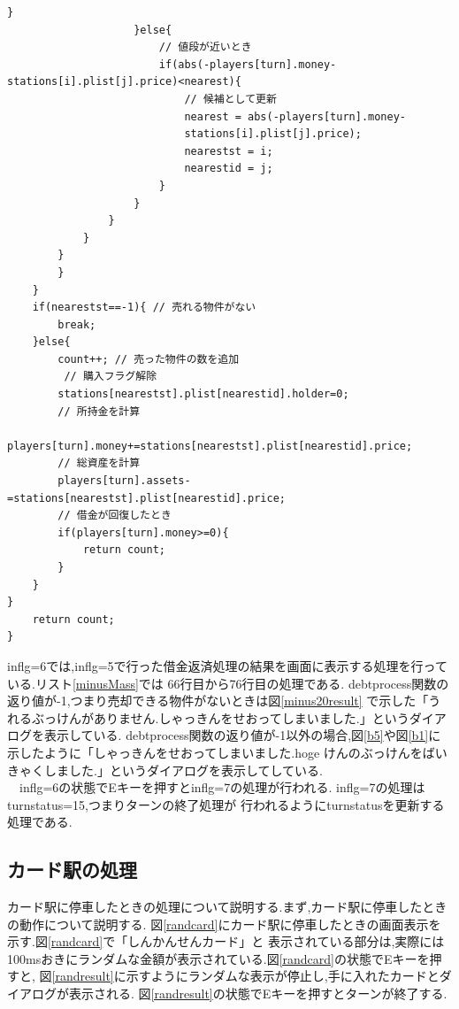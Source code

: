 \documentclass[a4j]{jarticle}
\begin{document}
\begin{lstlisting}[basicstyle=\ttfamily\footnotesize, frame=single,label=sale,caption=sale関数]
                    }
                    }else{
                        // 値段が近いとき
                        if(abs(-players[turn].money-stations[i].plist[j].price)<nearest){
                            // 候補として更新
                            nearest = abs(-players[turn].money-
                            stations[i].plist[j].price);
                            nearestst = i;
                            nearestid = j;                                 
                        }
                    }
                }
            }
        }
        }
    }
    if(nearestst==-1){ // 売れる物件がない
        break;
    }else{
        count++; // 売った物件の数を追加
         // 購入フラグ解除
        stations[nearestst].plist[nearestid].holder=0;
        // 所持金を計算
        players[turn].money+=stations[nearestst].plist[nearestid].price;
        // 総資産を計算
        players[turn].assets-=stations[nearestst].plist[nearestid].price;
        // 借金が回復したとき
        if(players[turn].money>=0){
            return count;
        }
    }      
}
    return count;
}
        \end{lstlisting}

        inflg=6では,inflg=5で行った借金返済処理の結果を画面に表示する処理を行っている.リスト\ref{minusMass}では
        66行目から76行目の処理である. debtprocess関数の返り値が-1,つまり売却できる物件がないときは図\ref{minus20result}
        で示した「うれるぶっけんがありません.しゃっきんをせおってしまいました.」というダイアログを表示している.
        debtprocess関数の返り値が-1以外の場合,図\ref{b5}や図\ref{b1}に示したように「しゃっきんをせおってしまいました.hoge
        けんのぶっけんをばいきゃくしました.」というダイアログを表示してしている.\\
        　inflg=6の状態でEキーを押すとinflg=7の処理が行われる. inflg=7の処理はturnstatus=15,つまりターンの終了処理が
        行われるようにturnstatusを更新する処理である.

    \subsection{カード駅の処理}
    カード駅に停車したときの処理について説明する.まず,カード駅に停車したときの動作について説明する.
    図\ref{randcard}にカード駅に停車したときの画面表示を示す.図\ref{randcard}で「しんかんせんカード」と
    表示されている部分は,実際には100msおきにランダムな金額が表示されている.図\ref{randcard}の状態でEキーを押すと,
    図\ref{randresult}に示すようにランダムな表示が停止し,手に入れたカードとダイアログが表示される.
    図\ref{randresult}の状態でEキーを押すとターンが終了する.
\end{document}
